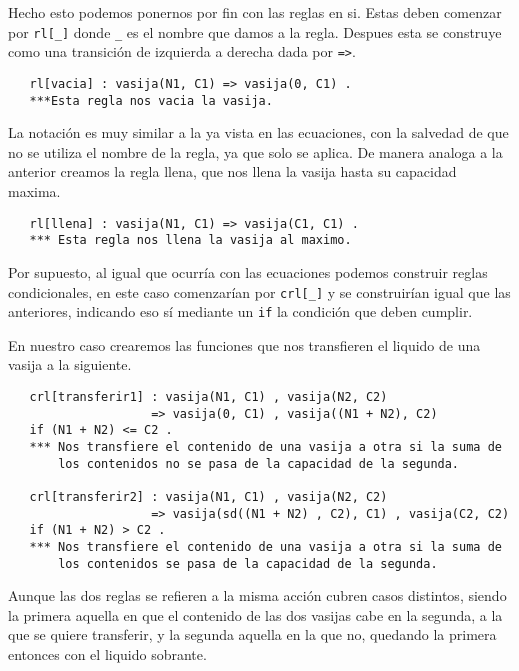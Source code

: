 Hecho esto podemos ponernos por fin con las reglas en si. Estas deben comenzar por \verb"rl[_]" donde \verb"_" es el nombre que damos a la regla. Despues esta se construye como una transición de izquierda a derecha dada por \verb"=>".\par

{\codesize
\begin{verbatim}
   rl[vacia] : vasija(N1, C1) => vasija(0, C1) .
   ***Esta regla nos vacia la vasija.
\end{verbatim}
}
La notación es muy similar a la ya vista en las ecuaciones, con la salvedad de que no se utiliza el nombre de la regla, ya que solo se aplica. De manera analoga a la anterior creamos la regla llena, que nos llena la vasija hasta su capacidad maxima.\par
{\codesize
\begin{verbatim}
   rl[llena] : vasija(N1, C1) => vasija(C1, C1) .
   *** Esta regla nos llena la vasija al maximo.
\end{verbatim}
}
Por supuesto, al igual que ocurría con las ecuaciones podemos construir reglas condicionales, en este caso comenzarían por \verb"crl[_]" y se construirían igual que las anteriores, indicando eso sí mediante un \texttt{if} la condición que deben cumplir.\par

En nuestro caso crearemos las funciones que nos transfieren el liquido de una vasija a la siguiente.\par 
{\codesize
\begin{verbatim}
   crl[transferir1] : vasija(N1, C1) , vasija(N2, C2) 
                    => vasija(0, C1) , vasija((N1 + N2), C2) 
   if (N1 + N2) <= C2 .
   *** Nos transfiere el contenido de una vasija a otra si la suma de 
       los contenidos no se pasa de la capacidad de la segunda.

   crl[transferir2] : vasija(N1, C1) , vasija(N2, C2) 
                    => vasija(sd((N1 + N2) , C2), C1) , vasija(C2, C2)
   if (N1 + N2) > C2 .
   *** Nos transfiere el contenido de una vasija a otra si la suma de 
       los contenidos se pasa de la capacidad de la segunda.
\end{verbatim}
}
Aunque las dos reglas se refieren a la misma acción cubren casos distintos, siendo la primera aquella en que el contenido de las dos vasijas cabe en la segunda, a la que se quiere transferir, y la segunda aquella en la que no, quedando la primera entonces con el liquido sobrante.\par

